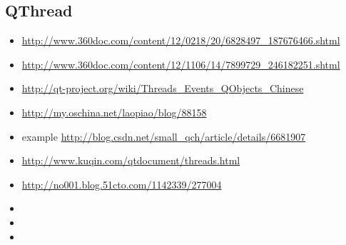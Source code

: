 \documentclass[9pt,b5paper]{article}
\begin{document}
\subsection{QThread}
\label{sec-17-22}
\begin{itemize}
\item \url{http://www.360doc.com/content/12/0218/20/6828497_187676466.shtml}
\item \url{http://www.360doc.com/content/12/1106/14/7899729_246182251.shtml}
\item \url{http://qt-project.org/wiki/Threads_Events_QObjects_Chinese}
\item \url{http://my.oschina.net/laopiao/blog/88158}
\item example \url{http://blog.csdn.net/small_qch/article/details/6681907}
\item \url{http://www.kuqin.com/qtdocument/threads.html}
\item \url{http://no001.blog.51cto.com/1142339/277004}
\item 
\item 
\item 
\end{itemize}
\end{document}
